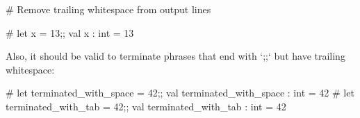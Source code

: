 # Remove trailing whitespace from output lines

\begin{ocaml}
# let x = 13;;
val x : int = 13  
\end{ocaml}


Also, it should be valid to terminate phrases that end with `;;` but have
trailing whitespace:

\begin{ocaml}
# let terminated_with_space = 42;; 
val terminated_with_space : int = 42
# let terminated_with_tab = 42;;	
val terminated_with_tab : int = 42
\end{ocaml}
